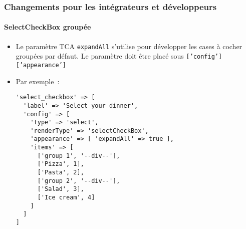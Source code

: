 %

\begin{frame}[fragile]
	\frametitle{Changements pour les intégrateurs et développeurs}
	\framesubtitle{SelectCheckBox groupée}

	\lstset{basicstyle=\tiny\ttfamily}

	\begin{itemize}
		\item Le paramètre TCA \texttt{expandAll} s'utilise pour développer les
            cases à cocher groupées par défaut. Le paramètre doit être placé sous\newline
			\smaller\texttt{['config']['appearance']}\normalsize
		\item Par exemple~:
\begin{lstlisting}
'select_checkbox' => [
  'label' => 'Select your dinner',
  'config' => [
    'type' => 'select',
    'renderType' => 'selectCheckBox',
    'appearance' => [ 'expandAll' => true ],
    'items' => [
      ['group 1', '--div--'],
      ['Pizza', 1],
      ['Pasta', 2],
      ['group 2', '--div--'],
      ['Salad', 3],
      ['Ice cream', 4]
    ]
  ]
]
\end{lstlisting}

	\end{itemize}

\end{frame}

